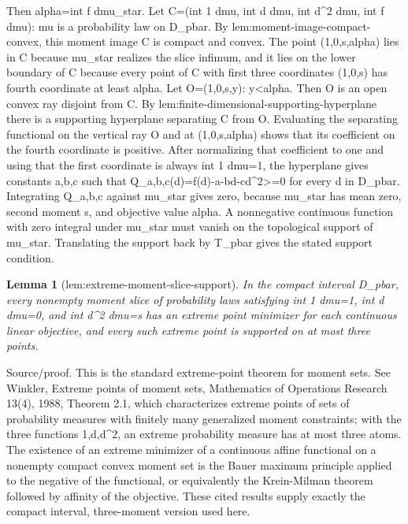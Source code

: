 \documentclass{article}
\newtheorem{lemma}{Lemma}
\begin{document}
Then alpha=int f dmu_star. Let C={(int 1 dmu, int d dmu, int d^2 dmu, int f dmu): mu is a probability law on D_pbar}. By lem:moment-image-compact-convex, this moment image C is compact and convex. The point (1,0,s,alpha) lies in C because mu_star realizes the slice infimum, and it lies on the lower boundary of C because every point of C with first three coordinates (1,0,s) has fourth coordinate at least alpha. Let O={(1,0,s,y): y<alpha}. Then O is an open convex ray disjoint from C. By lem:finite-dimensional-supporting-hyperplane there is a supporting hyperplane separating C from O. Evaluating the separating functional on the vertical ray O and at (1,0,s,alpha) shows that its coefficient on the fourth coordinate is positive. After normalizing that coefficient to one and using that the first coordinate is always int 1 dmu=1, the hyperplane gives constants a,b,c such that Q_{a,b,c}(d)=f(d)-a-bd-cd^2>=0 for every d in D_pbar. Integrating Q_{a,b,c} against mu_star gives zero, because mu_star has mean zero, second moment s, and objective value alpha. A nonnegative continuous function with zero integral under mu_star must vanish on the topological support of mu_star. Translating the support back by T_pbar gives the stated support condition.

\begin{lemma}[lem:extreme-moment-slice-support]\label{lem:extreme-moment-slice-support}
In the compact interval D_pbar, every nonempty moment slice of probability laws satisfying int 1 dmu=1, int d dmu=0, and int d^2 dmu=s has an extreme point minimizer for each continuous linear objective, and every such extreme point is supported on at most three points.
\end{lemma}
Source/proof. This is the standard extreme-point theorem for moment sets. See Winkler, Extreme points of moment sets, Mathematics of Operations Research 13(4), 1988, Theorem 2.1, which characterizes extreme points of sets of probability measures with finitely many generalized moment constraints; with the three functions 1,d,d^2, an extreme probability measure has at most three atoms. The existence of an extreme minimizer of a continuous affine functional on a nonempty compact convex moment set is the Bauer maximum principle applied to the negative of the functional, or equivalently the Krein-Milman theorem followed by affinity of the objective. These cited results supply exactly the compact interval, three-moment version used here.
\end{document}
